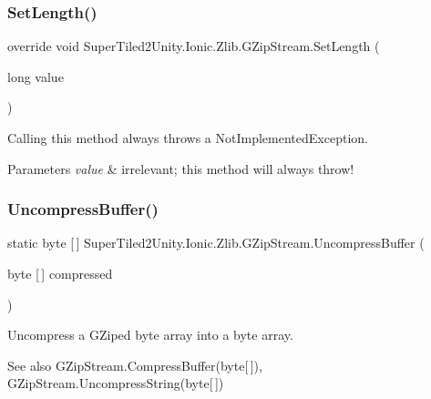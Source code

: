 \subsubsection{\texorpdfstring{Set\+Length()}{SetLength()}}
{\footnotesize\ttfamily override void Super\+Tiled2\+Unity.\+Ionic.\+Zlib.\+G\+Zip\+Stream.\+Set\+Length (\begin{DoxyParamCaption}\item[{long}]{value }\end{DoxyParamCaption})}



Calling this method always throws a Not\+Implemented\+Exception. 


\begin{DoxyParams}{Parameters}
{\em value} & irrelevant; this method will always throw!\\
\hline
\end{DoxyParams}
\mbox{\label{class_super_tiled2_unity_1_1_ionic_1_1_zlib_1_1_g_zip_stream_afe494e891223e6d1de0d09ea8eeb3566}} 
\subsubsection{\texorpdfstring{Uncompress\+Buffer()}{UncompressBuffer()}}
{\footnotesize\ttfamily static byte \mbox{[}$\,$\mbox{]} Super\+Tiled2\+Unity.\+Ionic.\+Zlib.\+G\+Zip\+Stream.\+Uncompress\+Buffer (\begin{DoxyParamCaption}\item[{byte \mbox{[}$\,$\mbox{]}}]{compressed }\end{DoxyParamCaption})\hspace{0.3cm}{\ttfamily [static]}}



Uncompress a G\+Zip\textquotesingle{}ed byte array into a byte array. 

\begin{DoxySeeAlso}{See also}
G\+Zip\+Stream.\+Compress\+Buffer(byte\mbox{[}$\,$\mbox{]}), G\+Zip\+Stream.\+Uncompress\+String(byte\mbox{[}$\,$\mbox{]})


\end{DoxySeeAlso}




